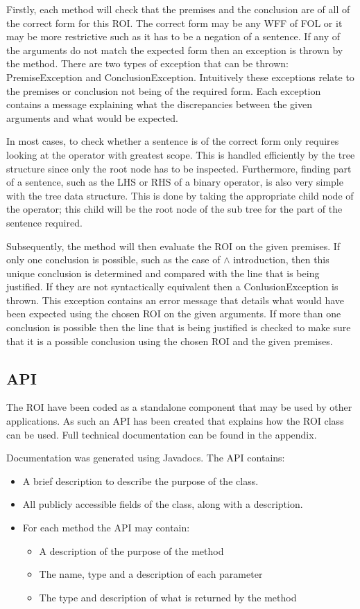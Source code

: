 Firstly, each method will check that the premises and the conclusion are of all of the correct form for this ROI. The correct form may be any WFF of FOL or it may be more restrictive such as it has to be a negation of a sentence. If any of the arguments do not match the expected form then an exception is thrown by the method. There are two types of exception that can be thrown: PremiseException and ConclusionException. Intuitively these exceptions relate to the premises or conclusion not being of the required form. Each exception contains a message explaining what the discrepancies between the given arguments and what would be expected.

In most cases, to check whether a sentence is of the correct form only requires looking at the operator with greatest scope. This is handled efficiently by the tree structure since only the root node has to be inspected. Furthermore, finding part of a sentence, such as the LHS  or RHS of a binary operator, is also very simple with the tree data structure. This is done by taking the appropriate child node of the operator; this child will be the root node of the sub tree for the part of the sentence required.

Subsequently, the method will then evaluate the ROI on the given premises. If only one conclusion is possible, such as the case of $\land$ introduction, then this unique conclusion is determined and compared with the line that is being justified. If they are not syntactically equivalent then a ConlusionException is thrown. This exception contains an error message that details what would have been expected using the chosen ROI on the given arguments. If more than one conclusion is possible then the line that is being justified is checked to make sure that it is a possible conclusion using the chosen ROI and the given premises.

\subsection{API} 

The ROI have been coded as a standalone component that may be used by other applications. As such an API has been created that explains how the ROI class can be used. Full technical documentation can be found in the appendix. 

Documentation was generated using Javadocs. 
The API contains:
\begin{itemize}
\item{A brief description to describe the purpose of the class.}
\item{All publicly accessible fields of the class, along with a description.}
\item{For each method the API may contain:}
\begin{itemize}
\item{A description of the purpose of the method}
\item{The name, type and a description of each parameter}
\item{The type and description of  what is returned by the method}
\end{itemize}
\end{itemize}

